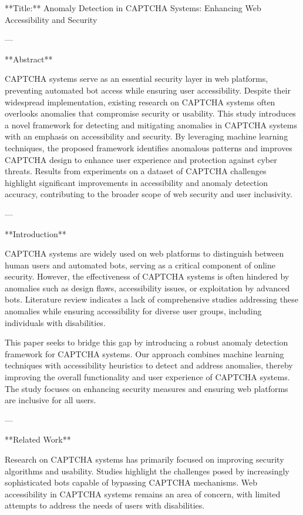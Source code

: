 **Title:** Anomaly Detection in CAPTCHA Systems: Enhancing Web Accessibility and Security

---

**Abstract**

CAPTCHA systems serve as an essential security layer in web platforms, preventing automated bot access while ensuring user accessibility. Despite their widespread implementation, existing research on CAPTCHA systems often overlooks anomalies that compromise security or usability. This study introduces a novel framework for detecting and mitigating anomalies in CAPTCHA systems with an emphasis on accessibility and security. By leveraging machine learning techniques, the proposed framework identifies anomalous patterns and improves CAPTCHA design to enhance user experience and protection against cyber threats. Results from experiments on a dataset of CAPTCHA challenges highlight significant improvements in accessibility and anomaly detection accuracy, contributing to the broader scope of web security and user inclusivity.

---

**Introduction**

CAPTCHA systems are widely used on web platforms to distinguish between human users and automated bots, serving as a critical component of online security. However, the effectiveness of CAPTCHA systems is often hindered by anomalies such as design flaws, accessibility issues, or exploitation by advanced bots. Literature review indicates a lack of comprehensive studies addressing these anomalies while ensuring accessibility for diverse user groups, including individuals with disabilities.

This paper seeks to bridge this gap by introducing a robust anomaly detection framework for CAPTCHA systems. Our approach combines machine learning techniques with accessibility heuristics to detect and address anomalies, thereby improving the overall functionality and user experience of CAPTCHA systems. The study focuses on enhancing security measures and ensuring web platforms are inclusive for all users.

---

**Related Work**

Research on CAPTCHA systems has primarily focused on improving security algorithms and usability. Studies highlight the challenges posed by increasingly sophisticated bots capable of bypassing CAPTCHA mechanisms. Web accessibility in CAPTCHA systems remains an area of concern, with limited attempts to address the needs of users with disabilities.

